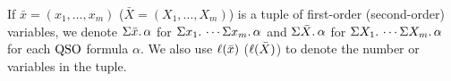 If $\bar{x} = (x_1,\ldots,x_m)$ ($\bar{X} = (X_1,\ldots,X_m)$) is a tuple of first-order (second-order) variables, we denote $\Sigma{\bar{x}}.\,\alpha$ for $\Sigma{x_1}.\,\cdots\Sigma{x_m}.\,\alpha$ and $\Sigma{\bar{X}}.\,\alpha$ for $\Sigma{X_1}.\,\cdots\Sigma{X_m}.\,\alpha$ for each ${\rm QSO}$ formula $\alpha$. We also use $\ell(\bar{x})$ ($\ell(\bar{X})$) to denote the number or variables in the tuple.
%

